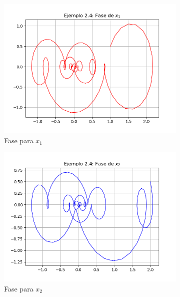 \documentclass[a4paper]{article}
\begin{document}
\begin{center}
\begin{figure}[ht!]
\begin{subfigure}{0.6\textwidth}
  \centering
  \includegraphics[width=\linewidth]{ejemplo_2_4_5.png}
   \caption{Fase para $x_1$}
\end{subfigure}
\begin{subfigure}{0.6\textwidth}
  \centering
  \includegraphics[width=\linewidth]{ejemplo_2_4_6.png}
  \caption{Fase para $x_2$}
\end{subfigure}
\begin{subfigure}{0.6\textwidth}
  \centering

\end{subfigure}
\end{figure}
\end{center}
\end{document}
